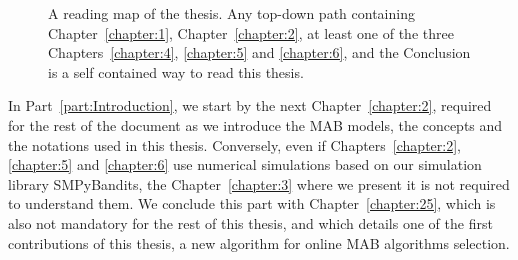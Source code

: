 \begin{figure}[h!]
{
    }
    \caption[Organization of the thesis: a reading map]{A reading map of the thesis. Any top-down path containing Chapter~\ref{chapter:1}, Chapter~\ref{chapter:2}, at least one of the three Chapters~\ref{chapter:4}, \ref{chapter:5} and \ref{chapter:6}, and the Conclusion is a self contained way to read this thesis.}
    \label{fig:1:organization}
\end{figure}

In Part~\ref{part:Introduction}, we start by the next Chapter~\ref{chapter:2}, required for the rest of the document as we introduce the MAB models, the concepts and the notations used in this thesis.
Conversely, even if Chapters~\ref{chapter:2}, \ref{chapter:5} and \ref{chapter:6} use numerical simulations based on our simulation library SMPyBandits, the Chapter~\ref{chapter:3} where we present it is not required to understand them.
We conclude this part with Chapter~\ref{chapter:25}, which is also not mandatory for the rest of this thesis, and which details one of the first contributions of this thesis, a new algorithm for online MAB algorithms selection.

